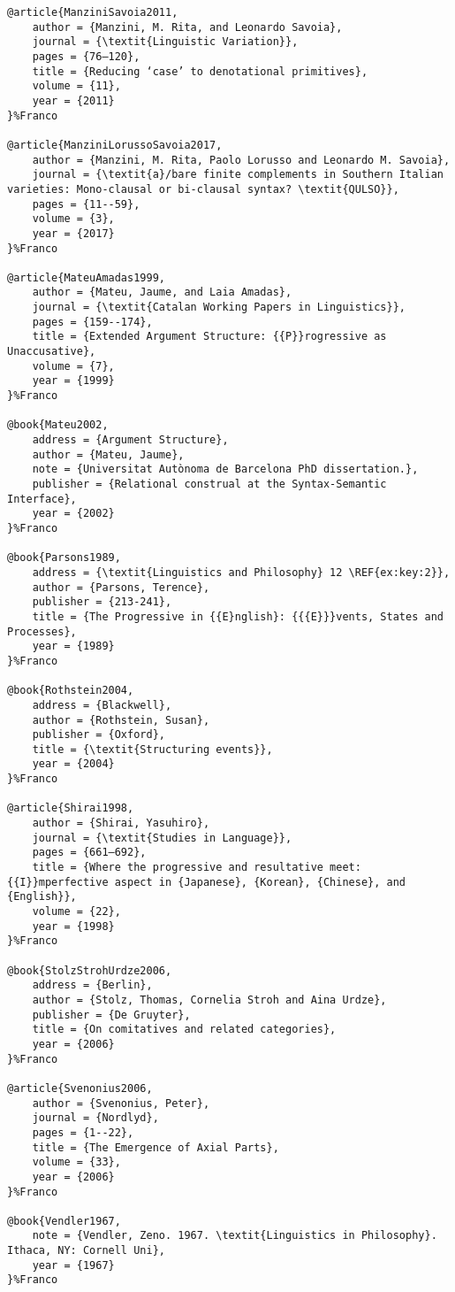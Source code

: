 \documentclass[output=paper,colorlinks,citecolor=brown]{./langscibook}
\begin{document}
\begin{verbatim}
@article{ManziniSavoia2011,
	author = {Manzini, M. Rita, and Leonardo Savoia},
	journal = {\textit{Linguistic Variation}},
	pages = {76–120},
	title = {Reducing ‘case’ to denotational primitives},
	volume = {11},
	year = {2011}
}%Franco

@article{ManziniLorussoSavoia2017,
	author = {Manzini, M. Rita, Paolo Lorusso and Leonardo M. Savoia},
	journal = {\textit{a}/bare finite complements in Southern Italian varieties: Mono-clausal or bi-clausal syntax? \textit{QULSO}},
	pages = {11--59},
	volume = {3},
	year = {2017}
}%Franco

@article{MateuAmadas1999,
	author = {Mateu, Jaume, and Laia Amadas},
	journal = {\textit{Catalan Working Papers in Linguistics}},
	pages = {159--174},
	title = {Extended Argument Structure: {{P}}rogressive as Unaccusative},
	volume = {7},
	year = {1999}
}%Franco

@book{Mateu2002,
	address = {Argument Structure},
	author = {Mateu, Jaume},
	note = {Universitat Autònoma de Barcelona PhD dissertation.},
	publisher = {Relational construal at the Syntax-Semantic Interface},
	year = {2002}
}%Franco

@book{Parsons1989,
	address = {\textit{Linguistics and Philosophy} 12 \REF{ex:key:2}},
	author = {Parsons, Terence},
	publisher = {213-241},
	title = {The Progressive in {{E}nglish}: {{{E}}}vents, States and Processes},
	year = {1989}
}%Franco

@book{Rothstein2004,
	address = {Blackwell},
	author = {Rothstein, Susan},
	publisher = {Oxford},
	title = {\textit{Structuring events}},
	year = {2004}
}%Franco

@article{Shirai1998,
	author = {Shirai, Yasuhiro},
	journal = {\textit{Studies in Language}},
	pages = {661–692},
	title = {Where the progressive and resultative meet: {{I}}mperfective aspect in {Japanese}, {Korean}, {Chinese}, and {English}},
	volume = {22},
	year = {1998}
}%Franco

@book{StolzStrohUrdze2006,
	address = {Berlin},
	author = {Stolz, Thomas, Cornelia Stroh and Aina Urdze},
	publisher = {De Gruyter},
	title = {On comitatives and related categories},
	year = {2006}
}%Franco

@article{Svenonius2006,
	author = {Svenonius, Peter},
	journal = {Nordlyd},
	pages = {1--22},
	title = {The Emergence of Axial Parts},
	volume = {33},
	year = {2006}
}%Franco

@book{Vendler1967,
    note = {Vendler, Zeno. 1967. \textit{Linguistics in Philosophy}. Ithaca, NY: Cornell Uni},
    year = {1967}
}%Franco

\end{verbatim}
\sloppy\printbibliography[heading=subbibliography,notkeyword=this]
\end{document}
